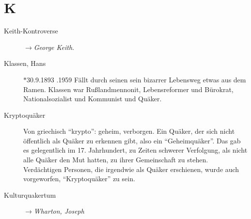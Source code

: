 \section*{K}

\articlesize

\begin{description}


 \item[Keith-Kontroverse] $\to$\textit{George Keith}.

 \item[Klassen, Hans] $\ast$30.9.1893 .1959 Fällt durch seinen sein bizarrer Lebensweg etwas aus dem Ramen. Klassen war Rußlandmennonit, Lebensreformer und Bürokrat, Nationalsozialist und Kommunist und Quäker.


 \item[Kryptoquäker] Von griechisch "`krypto"': geheim, verborgen. Ein Quäker, der sich nicht öffentlich als Quäker zu erkennen gibt, also ein "`Geheimquäker"'. Das gab es gelegentlich im 17. Jahrhundert, zu Zeiten schwerer Verfolgung, als nicht alle Quäker den Mut hatten, zu ihrer Gemeinschaft zu stehen. Verdächtigen Personen, die irgendwie als Quäker erschienen, wurde auch vorgeworfen, "`Kryptoquäker"' zu sein.

 \item[Kulturquakertum] $\to$\textit{Wharton, Joseph}

 \end{description}
\normalsize
